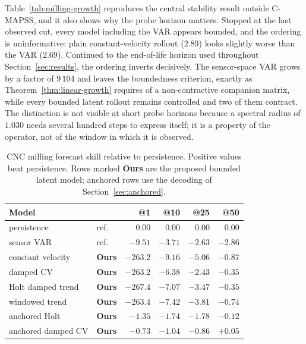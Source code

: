 \documentclass[a4paper,fleqn]{cas-sc}
\newcommand{\tinytable}{\scriptsize}
\newcommand{\verytighttables}{%
  \setlength{\tabcolsep}{3.5pt}%
  \renewcommand{\arraystretch}{1.05}%
}
\begin{document}
Table~\ref{tab:milling-growth} reproduces the central stability result outside
C-MAPSS, and it also shows why the probe horizon matters. Stopped at the last
observed cut, every model including the VAR appears bounded, and the ordering is
uninformative: plain constant-velocity rollout ($2.89$) looks slightly worse
than the VAR ($2.69$). Continued to the end-of-life horizon used throughout
Section~\ref{sec:results}, the ordering inverts decisively. The sensor-space
VAR grows by a factor of $9\,104$ and leaves the boundedness criterion, exactly
as Theorem~\ref{thm:linear-growth} requires of a non-contractive companion
matrix, while every bounded latent rollout remains controlled and two of them
contract. The distinction is not visible at short probe horizons because a
spectral radius of $1.030$ needs several hundred steps to express itself; it is
a property of the operator, not of the window in which it is observed.

\begin{table}[t]
\centering
\caption{CNC milling forecast skill relative to persistence. Positive values
beat persistence. Rows marked \textbf{Ours} are the proposed bounded latent
model; anchored rows use the decoding of Section~\ref{sec:anchored}.}
\label{tab:milling-skill}
\tinytable
\verytighttables
\begin{tabular}{@{}llrrrr@{}}
\toprule
Model & & @1 & @10 & @25 & @50 \\
\midrule
persistence        & ref.            & $0.00$    & $0.00$  & $0.00$  & $0.00$ \\
sensor VAR         & ref.            & $-9.51$   & $-3.71$ & $-2.63$ & $-2.86$ \\
\midrule
constant velocity  & \textbf{Ours} & $-263.2$  & $-9.16$ & $-5.06$ & $-0.87$ \\
damped CV          & \textbf{Ours} & $-263.2$  & $-6.38$ & $-2.43$ & $-0.35$ \\
Holt damped trend  & \textbf{Ours} & $-267.4$  & $-7.07$ & $-3.47$ & $-0.35$ \\
windowed trend     & \textbf{Ours} & $-263.4$  & $-7.42$ & $-3.81$ & $-0.74$ \\
anchored Holt      & \textbf{Ours} & $-1.35$   & $-1.74$ & $-1.78$ & $-0.12$ \\
anchored damped CV & \textbf{Ours} & $\mathbf{-0.73}$ & $\mathbf{-1.04}$ & $\mathbf{-0.86}$ & $\mathbf{+0.05}$ \\
\bottomrule
\end{tabular}
\end{table}
\end{document}
